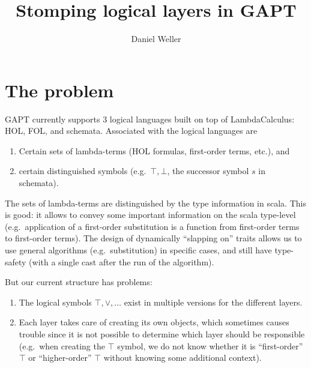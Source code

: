 \documentclass[11pt,a4paper]{article}
\title{Stomping logical layers in GAPT}
\author{Daniel Weller}
\begin{document}
%
\maketitle
%
\section{The problem}
%
GAPT currently supports 3 logical languages built on top of LambdaCalculus:
HOL, FOL, and schemata. Associated with the logical languages are
%
\begin{enumerate}
  \item Certain sets of lambda-terms (HOL formulas, first-order terms, etc.), and
  \item certain distinguished symbols (e.g.~$\top, \bot$, the successor symbol $s$ in schemata).
\end{enumerate}
%
The sets of lambda-terms are distinguished by the type information in scala. This is good: it allows
to convey some important information on the scala type-level (e.g.~application of a first-order
substitution is a function from first-order terms to first-order terms). The design of dynamically
``slapping on'' traits allows us to use general algorithms (e.g.~substitution) in specific cases, and
still have type-safety (with a single cast after the run of the algorithm).

But our current structure has problems:
%
\begin{enumerate}
  \item The logical symbols $\top, \lor, \ldots$ exist in multiple versions for the different layers.
  \item Each layer takes care of creating its own objects, which sometimes causes trouble since it
    is not possible to determine which layer should be responsible (e.g.~when creating the $\top$ symbol,
    we do not know whether it is ``first-order'' $\top$ or ``higher-order'' $\top$ without knowing
    some additional context).
\end{enumerate}
%
\end{document}
